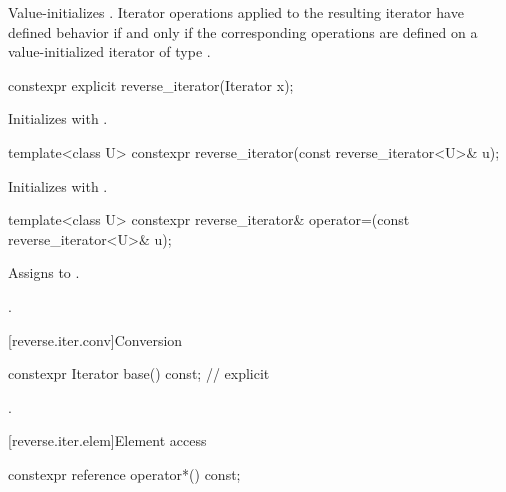 \begin{itemdescr}
\pnum
\effects
Value-initializes
.
Iterator operations applied to the resulting iterator have defined behavior
if and only if the corresponding operations are defined on a value-initialized iterator of type
.
\end{itemdescr}

%
\begin{itemdecl}
constexpr explicit reverse_iterator(Iterator x);
\end{itemdecl}

\begin{itemdescr}
\pnum
\effects
Initializes
with .
\end{itemdescr}

%
\begin{itemdecl}
template<class U> constexpr reverse_iterator(const reverse_iterator<U>& u);
\end{itemdecl}

\begin{itemdescr}
\pnum
\effects
Initializes
with
.
\end{itemdescr}

%
\begin{itemdecl}
template<class U>
  constexpr reverse_iterator&
    operator=(const reverse_iterator<U>& u);
\end{itemdecl}

\begin{itemdescr}
\pnum
\effects
Assigns  to .

\pnum
\returns
{}.
\end{itemdescr}

[reverse.iter.conv]{Conversion}

%
\begin{itemdecl}
constexpr Iterator base() const;          // explicit
\end{itemdecl}

\begin{itemdescr}
\pnum
\returns
{}.
\end{itemdescr}

[reverse.iter.elem]{Element access}

%
\begin{itemdecl}
constexpr reference operator*() const;
\end{itemdecl}

